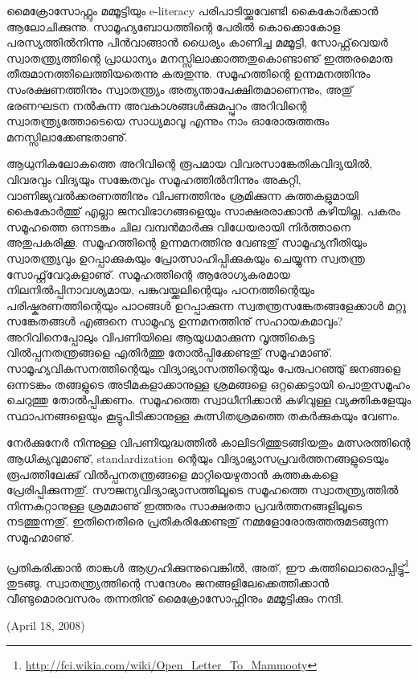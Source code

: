 ﻿
\enlargethispage{3\baselineskip}

മൈക്രോസോഫ്റ്റും മമ്മൂട്ടിയും e-literacy പരിപാടിയ്ക്കുവേണ്ടി കൈകോര്‍ക്കാന്‍ ആലോചിക്കുന്നു. 
സാമൂഹ്യബോധത്തിന്റെ പേരില്‍ കൊക്കൊകോള പരസ്യത്തില്‍നിന്നു പിന്‍വാങ്ങാന്‍ ധൈര്യം കാണിച്ച മമ്മൂട്ടി, 
സോഫ്റ്റ്‌വെയര്‍ സ്വാതന്ത്ര്യത്തിന്റെ പ്രാധാന്യം മനസ്സിലാക്കാത്തതുകൊണ്ടാണു് ഇത്തരമൊരു തീരുമാനത്തിലെത്തിയതെന്നു 
കരുതുന്നു. സമൂഹത്തിന്റെ ഉന്നമനത്തിനും സംരക്ഷണത്തിനും സ്വാതന്ത്ര്യം അത്യന്താപേക്ഷിതമാണെന്നും, അതു് ഭരണഘടന 
നല്‍കുന്ന അവകാശങ്ങള്‍ക്കുമപ്പുറം അറിവിന്റെ സ്വാതന്ത്ര്യത്തോടെയെ സാധ്യമാവൂ എന്നും നാം ഓരോരുത്തരും 
മനസ്സിലാക്കേണ്ടതാണു്.

ആധുനികലോകത്തെ അറിവിന്റെ രൂപമായ വിവരസാങ്കേതികവിദ്യയില്‍, വിവരവും വിദ്യയും സങ്കേതവും സമൂഹത്തില്‍നിന്നും അകറ്റി, 
വാണിജ്യവല്‍ക്കരണത്തിനും വിപണത്തിനും ശ്രമിക്കുന്ന കുത്തകളുമായി കൈകോര്‍ത്തു് എല്ലാ ജനവിഭാഗങ്ങളെയും 
സാക്ഷരരാക്കാന്‍ കഴിയില്ല. പകരം സമൂഹത്തെ ഒന്നടങ്കം ചില വമ്പന്‍മാര്‍ക്കു വിധേയരായി നിര്‍ത്താനെ അതുപകരിക്കൂ. 
സമൂഹത്തിന്റെ ഉന്നമനത്തിനു വേണ്ടതു് സാമൂഹ്യനീതിയും സ്വാതന്ത്ര്യവും ഉറപ്പാക്കുകയും പ്രോത്സാഹിപ്പിക്കുകയും 
ചെയ്യുന്ന സ്വതന്ത്ര സോഫ്റ്റ്‌വേറുകളാണു്. സമൂഹത്തിന്റെ ആരോഗ്യകരമായ നിലനില്‍പ്പിനാവശ്യമായ, പങ്കുവയ്ക്കലിന്റെയും 
പഠനത്തിന്റെയും പരിഷ്കരണത്തിന്റെയും പാഠങ്ങള്‍ ഉറപ്പാക്കുന്ന സ്വതന്ത്രസങ്കേതങ്ങളേക്കാള്‍ മറ്റു സങ്കേതങ്ങള്‍ എങ്ങനെ 
സാമൂഹ്യ ഉന്നമനത്തിനു് സഹായകമാവും? അറിവിനെപ്പോലും വിപണിയിലെ ആയുധമാക്കുന്ന വൃത്തികെട്ട വില്‍പ്പനതന്ത്രങ്ങളെ 
എതിര്‍ത്തു തോല്‍പ്പിക്കേണ്ടതു് സമൂഹമാണു്. സാമൂഹ്യവികസനത്തിന്റെയും വിദ്യാഭ്യാസത്തിന്റെയും പേരുപറഞ്ഞു് 
ജനങ്ങളെ ഒന്നടങ്കം തങ്ങളുടെ അടിമകളാക്കാനുള്ള ശ്രമങ്ങളെ ഒറ്റക്കെട്ടായി പൊതുസമൂഹം ചെറുത്തു തോല്‍പ്പിക്കണം. 
സമൂഹത്തെ സ്വാധീനിക്കാന്‍ കഴിവുള്ള വ്യക്തികളേയും സ്ഥാപനങ്ങളെയും കൂട്ടുപിടിക്കാനുള്ള കുത്സിതശ്രമത്തെ 
തകര്‍ക്കുകയും വേണം.

നേര്‍ക്കുനേര്‍ നിന്നുള്ള വിപണിയുദ്ധത്തില്‍ കാലിടറിത്തുടങ്ങിയതും മത്സരത്തിന്റെ ആധിക്യവുമാണു്, standardization ന്റെയും 
വിദ്യാഭ്യാസപ്രവര്‍ത്തനങ്ങളുടെയും രൂപത്തിലേക്കു് വില്‍പ്പനതന്ത്രങ്ങളെ മാറ്റിയെഴുതാന്‍ കുത്തകകളെ പ്രേരിപ്പിക്കുന്നതു്. 
 സൗജന്യവിദ്യാഭ്യാസത്തിലൂടെ സമൂഹത്തെ സ്വാതന്ത്ര്യത്തില്‍ നിന്നകറ്റാനുള്ള ശ്രമമാണു് ഇത്തരം സാക്ഷരതാ 
പ്രവര്‍ത്തനങ്ങളിലൂടെ നടത്തുന്നതു്. ഇതിനെതിരെ പ്രതികരിക്കേണ്ടതു് നമ്മളോരോരുത്തരുമടങ്ങുന്ന സമൂഹമാണു്.

\vskip 2pt

പ്രതികരിക്കാന്‍ താങ്കള്‍ ആഗ്രഹിക്കുന്നുവെങ്കില്‍, അത്, 
ഈ കത്തിലൊരൊപ്പിട്ടു്\footnote{\url{http://fci.wikia.com/wiki/Open_Letter_To_Mammooty}} തുടങ്ങൂ. 
സ്വാതന്ത്ര്യത്തിന്റെ സന്ദേശം ജനങ്ങളിലേക്കെത്തിക്കാന്‍ വീണ്ടുമൊരവസരം തന്നതിനു് മൈക്രോസോഫ്റ്റിനും മമ്മൂട്ടിക്കും നന്ദി.

\begin{flushright}(April 18, 2008)\end{flushright}
\newpage
